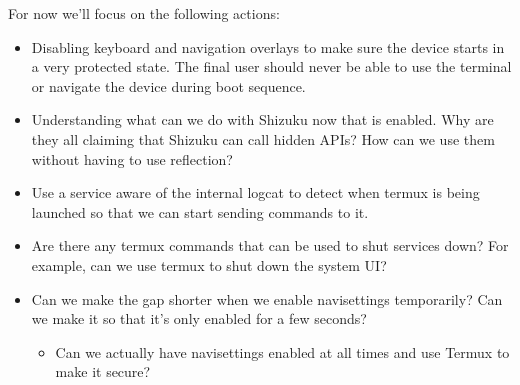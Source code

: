 For now we'll focus on the following actions:

\begin{itemize}
    \item Disabling keyboard and navigation overlays to make sure the device starts in a very protected state. The final user should never be able to use the terminal or navigate the device during boot sequence.
    \item Understanding what can we do with Shizuku now that is enabled. Why are they all claiming that Shizuku can call hidden APIs? How can we use them without having to use reflection?
    \item Use a service aware of the internal logcat to detect when termux is being launched so that we can start sending commands to it.
    \item Are there any termux commands that can be used to shut services down? For example, can we use termux to shut down the system UI?
    \item Can we make the gap shorter when we enable \gls{navisettings} temporarily? Can we make it so that it's only enabled for a few seconds?
    \begin{itemize}
        \item Can we actually have \gls{navisettings} enabled at all times and use Termux to make it secure?
    \end{itemize}
\end{itemize}